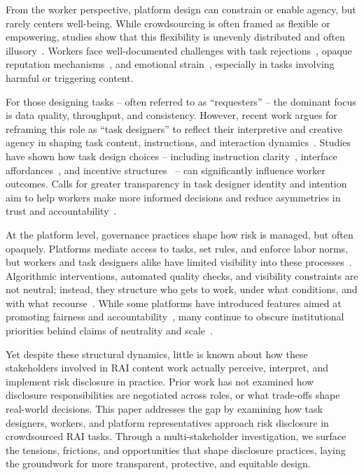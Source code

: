 From the worker perspective, platform design can constrain or enable agency, but rarely centers well-being. While crowdsourcing is often framed as flexible or empowering, studies show that this flexibility is unevenly distributed and often illusory~\cite{rechkemmer2022understanding, varanasi2022feeling, liang2021embracing}. Workers face well-documented challenges with task rejections~\cite{mcinnis2016taking}, opaque reputation mechanisms~\cite{saito2019turkscanner}, and emotional strain~\cite{flores2020challenges, martin2014being}, especially in tasks involving harmful or triggering content.

For those designing tasks -- often referred to as “requesters” -- the dominant focus is data quality, throughput, and consistency. However, recent work argues for reframing this role as “task designers” to reflect their interpretive and creative agency in shaping task content, instructions, and interaction dynamics~\cite{zheng2011task, bragg2018sprout, qian2025locating}. Studies have shown how task design choices -- including instruction clarity~\cite{wu2017confusing}, interface affordances~\cite{han2020crowd}, and incentive structures~\cite{ho2015incentivizing} -- can significantly influence worker outcomes. Calls for greater transparency in task designer identity and intention aim to help workers make more informed decisions and reduce asymmetries in trust and accountability~\cite{sutherland2018sharing, whiting2019fair, qian2025locating}.

At the platform level, governance practices shape how risk is managed, but often opaquely. Platforms mediate access to tasks, set rules, and enforce labor norms, but workers and task designers alike have limited visibility into these processes~\cite{toxtli2021quantifying, whiting2019fair, fieseler_unfairness_2019}. Algorithmic interventions, automated quality checks, and visibility constraints are not neutral; instead, they structure who gets to work, under what conditions, and with what recourse~\cite{gadiraju2017modus, rzeszotarski2012crowdscape}. While some platforms have introduced features aimed at promoting fairness and accountability~\cite{silberman2018responsible, whiting2019fair}, many continue to obscure institutional priorities behind claims of neutrality and scale~\cite{gray2016crowd, kingsley2015accounting}.

Yet despite these structural dynamics, little is known about how these stakeholders involved in RAI content work actually perceive, interpret, and implement risk disclosure in practice. Prior work has not examined how disclosure responsibilities are negotiated across roles, or what trade-offs shape real-world decisions. This paper addresses the gap by examining how task designers, workers, and platform representatives approach risk disclosure in crowdsourced RAI tasks. Through a multi-stakeholder investigation, we surface the tensions, frictions, and opportunities that shape disclosure practices, laying the groundwork for more transparent, protective, and equitable design.

